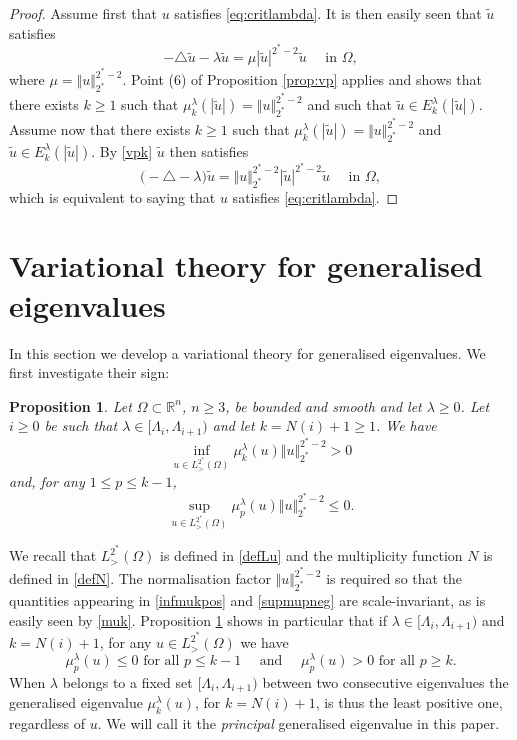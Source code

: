 \documentclass[10pt]{amsart}
\numberwithin{equation}{section}
\newcommand{\R}{\mathbb{R}}
\newcommand{\Om}{\Omega}
\newcommand{\mkl}{\mu_{k}^{\lambda}}
\newcommand{\mpl}{\mu_{p}^{\lambda}}
\theoremstyle{plain}
\newtheorem{prop}{Proposition}[section]%
\theoremstyle{remark}
\begin{document}
\begin{proof}
Assume first that $u$ satisfies \eqref{eq:critlambda}. It is then easily seen that $\tilde u$ satisfies 
$$-\triangle \tilde{u} - \lambda \tilde{u} = \mu |\tilde{u}|^{2^*-2} \tilde{u} \quad \text{ in } \Om, $$
where $\mu= \Vert u \Vert_{2^*}^{2^*-2}$. Point (6) of Proposition \ref{prop:vp} applies and shows that there exists $k \ge 1$ such that $\mkl(|\tilde{u}|) =  \Vert u \Vert_{2^*}^{2^*-2}$ and such that $\tilde{u} \in E_k^{\lambda}(|\tilde{u}|)$. Assume now that there exists $k \ge 1$ such that $\mkl(|\tilde{u}|)  = \Vert u \Vert_{2^*}^{2^*-2}$ and $\tilde{u} \in E_k^{\lambda}(|\tilde{u}|)$. By \eqref{vpk} $\tilde{u}$ then satisfies 
$$ \big(-\triangle - \lambda \big) \tilde{u} = \Vert u \Vert_{2^*}^{2^*-2} |\tilde{u}|^{2^*-2} \tilde{u} \quad \text{ in } \Om, $$
which is equivalent to saying that $u$ satisfies \eqref{eq:critlambda}. 
\end{proof}


\section{Variational theory for generalised eigenvalues} \label{vp:derivees}

In this section we develop a variational theory for generalised eigenvalues. We first investigate their sign:



 \begin{prop}  \label{prop:signvp}
  Let $\Om \subset \R^n$, $n \ge 3$, be bounded and smooth and let  $\lambda \ge 0$. Let $i \ge0$ be such that $\lambda \in [\Lambda_i, \Lambda_{i+1})$ and let $k = N(i)+1 \ge 1$. We have  
\begin{equation} \label{infmukpos}
 \inf_{u \in L^{2^*}_{>}(\Om)} \mu_k^{\lambda}(u)  \Vert u \Vert_{2^*}^{2^*-2}  > 0
 \end{equation}
and, for any $1 \le p \le k-1$,
\begin{equation} \label{supmupneg}
\sup_{u \in L^{2^*}_{>}(\Om)} \mpl(u)  \Vert u \Vert_{2^*}^{2^*-2} \le 0 .
\end{equation}
\end{prop}
We recall that $L^{2^*}_{>}(\Om)$ is defined in \eqref{defLu} and the multiplicity function $N$ is defined in \eqref{defN}. The normalisation factor $\Vert u \Vert_{2^*}^{2^*-2}$ is required so that the quantities appearing in \eqref{infmukpos} and \eqref{supmupneg} are scale-invariant, as is easily seen by \eqref{muk}. Proposition \ref{prop:signvp} shows in particular that if $\lambda \in [\Lambda_i, \Lambda_{i+1})$ and $k = N(i)+1$, for any $u \in L^{2^*}_{>}(\Om)$ we have
$$ \mpl(u) \le0 \text{ for all } p\le k-1 \quad \text{ and } \quad \mpl(u) >0 \text{ for all } p \ge k.$$
When $\lambda$ belongs to a fixed set $[\Lambda_i, \Lambda_{i+1})$ between two consecutive eigenvalues the generalised eigenvalue $\mkl(u)$, for $k = N(i)+1$, is thus the least positive one, regardless of $u$. We will call it the \emph{principal} generalised eigenvalue in this paper. 
\end{document}
